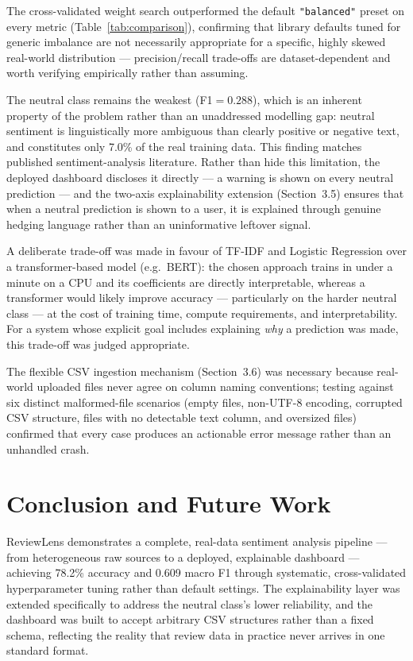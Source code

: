 \documentclass{article}
\begin{document}
The cross-validated weight search outperformed the default
\texttt{"balanced"} preset on every metric (Table~\ref{tab:comparison}),
confirming that library defaults tuned for generic imbalance are not
necessarily appropriate for a specific, highly skewed real-world
distribution — precision/recall trade-offs are dataset-dependent and worth
verifying empirically rather than assuming.

The neutral class remains the weakest (F1${=}0.288$), which is an inherent
property of the problem rather than an unaddressed modelling gap: neutral
sentiment is linguistically more ambiguous than clearly positive or
negative text, and constitutes only 7.0\% of the real training data. This
finding matches published sentiment-analysis literature. Rather than hide
this limitation, the deployed dashboard discloses it directly — a warning
is shown on every neutral prediction — and the two-axis explainability
extension (Section~3.5) ensures that when a neutral prediction is shown to
a user, it is explained through genuine hedging language rather than an
uninformative leftover signal.

A deliberate trade-off was made in favour of TF-IDF and Logistic Regression
over a transformer-based model (e.g.\ BERT): the chosen approach trains in
under a minute on a CPU and its coefficients are directly interpretable,
whereas a transformer would likely improve accuracy — particularly on the
harder neutral class — at the cost of training time, compute requirements,
and interpretability. For a system whose explicit goal includes explaining
\emph{why} a prediction was made, this trade-off was judged appropriate.

The flexible CSV ingestion mechanism (Section~3.6) was necessary because
real-world uploaded files never agree on column naming conventions; testing
against six distinct malformed-file scenarios (empty files, non-UTF-8
encoding, corrupted CSV structure, files with no detectable text column,
and oversized files) confirmed that every case produces an actionable error
message rather than an unhandled crash.

\section{Conclusion and Future Work}

ReviewLens demonstrates a complete, real-data sentiment analysis pipeline —
from heterogeneous raw sources to a deployed, explainable dashboard —
achieving 78.2\% accuracy and 0.609 macro F1 through systematic,
cross-validated hyperparameter tuning rather than default settings. The
explainability layer was extended specifically to address the neutral
class's lower reliability, and the dashboard was built to accept arbitrary
CSV structures rather than a fixed schema, reflecting the reality that
review data in practice never arrives in one standard format.
\end{document}
